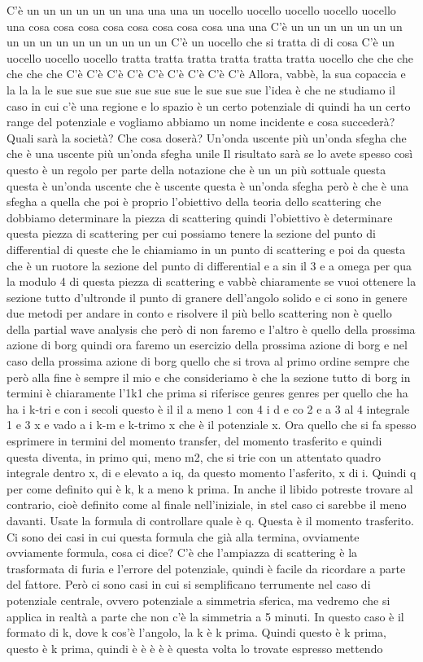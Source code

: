 {\begin{soluzione}
   C'è un un un un un un una una una un uocello uocello uocello uocello uocello una cosa cosa cosa cosa cosa cosa cosa cosa una una C'è un un un un un un un un un un un un un un un un un C'è un uocello che si tratta di di cosa C'è un uocello uocello uocello tratta tratta tratta tratta tratta tratta uocello che che che che che che C'è C'è C'è C'è C'è C'è C'è C'è C'è Allora, vabbè, la sua copaccia e la la la le sue sue sue sue sue sue sue le sue sue sue l'idea è che ne studiamo il caso in cui c'è una regione e lo spazio è un certo potenziale di quindi ha un certo range del potenziale e vogliamo abbiamo un nome incidente e cosa succederà? Quali sarà la società? Che cosa doserà? Un'onda uscente più un'onda sfegha che che è una uscente più un'onda sfegha unile Il risultato sarà se lo avete spesso così questo è un regolo per parte della notazione che è un un più sottuale questa questa è un'onda uscente che è uscente questa è un'onda sfegha però è che è una sfegha a quella che poi è proprio l'obiettivo della teoria dello scattering che dobbiamo determinare la piezza di scattering quindi l'obiettivo è determinare questa piezza di scattering per cui possiamo tenere la sezione del punto di differential di queste che le chiamiamo in un punto di scattering e poi da questa che è un ruotore la sezione del punto di differential e a sin il 3 e a omega per qua la modulo 4 di questa piezza di scattering e vabbè chiaramente se vuoi ottenere la sezione tutto d'ultronde il punto di granere dell'angolo solido e ci sono in genere due metodi per andare in conto e risolvere il più bello scattering non è quello della partial wave analysis che però di non faremo e l'altro è quello della prossima azione di borg quindi ora faremo un esercizio della prossima azione di borg e nel caso della prossima azione di borg quello che si trova al primo ordine sempre che però alla fine è sempre il mio e che consideriamo è che la sezione tutto di borg in termini è chiaramente l'1k1 che prima si riferisce genres genres per quello che ha ha i k-tri e con i secoli questo è il il a meno 1 con 4 i d e co 2 e a 3 al 4 integrale 1 e 3 x e vado a i k-m e k-trimo x che è il potenziale x. Ora quello che si fa spesso esprimere in termini del momento transfer, del momento trasferito e quindi questa diventa, in primo qui, meno m2, che si trie con un attentato quadro integrale dentro x, di e elevato a iq, da questo momento l'asferito, x di i. Quindi q per come definito qui è k, k a meno k prima. In anche il libido potreste trovare al contrario, cioè definito come al finale nell'iniziale, in stel caso ci sarebbe il meno davanti. Usate la formula di controllare quale è q. Questa è il momento trasferito. Ci sono dei casi in cui questa formula che già alla termina, ovviamente ovviamente formula, cosa ci dice? C'è che l'ampiazza di scattering è la trasformata di furia e l'errore del potenziale, quindi è facile da ricordare a parte del fattore. Però ci sono casi in cui si semplificano terrumente nel caso di potenziale centrale, ovvero potenziale a simmetria sferica, ma vedremo che si applica in realtà a parte che non c'è la simmetria a 5 minuti. In questo caso è il formato di k, dove k cos'è l'angolo, la k è k prima. Quindi questo è k prima, questo è k prima, quindi è è è è è questa volta lo trovate espresso mettendo 
\end{soluzione}}
